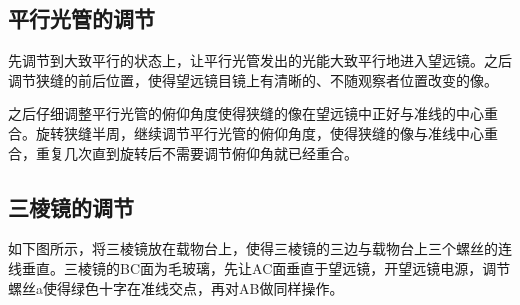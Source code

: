 \documentclass{article}
\begin{document}
\subsection{平行光管的调节}

先调节到大致平行的状态上，让平行光管发出的光能大致平行地进入望远镜。之后调节狭缝的前后位置，使得望远镜目镜上有清晰的、不随观察者位置改变的像。

之后仔细调整平行光管的俯仰角度使得狭缝的像在望远镜中正好与准线的中心重合。旋转狭缝半周，继续调节平行光管的俯仰角度，使得狭缝的像与准线中心重合，重复几次直到旋转后不需要调节俯仰角就已经重合。

\subsection{三棱镜的调节}

  如下图所示，将三棱镜放在载物台上，使得三棱镜的三边与载物台上三个螺丝的连线垂直。三棱镜的BC面为毛玻璃，先让AC面垂直于望远镜，开望远镜电源，调节螺丝a使得绿色十字在准线交点，再对AB做同样操作。
\end{document}
